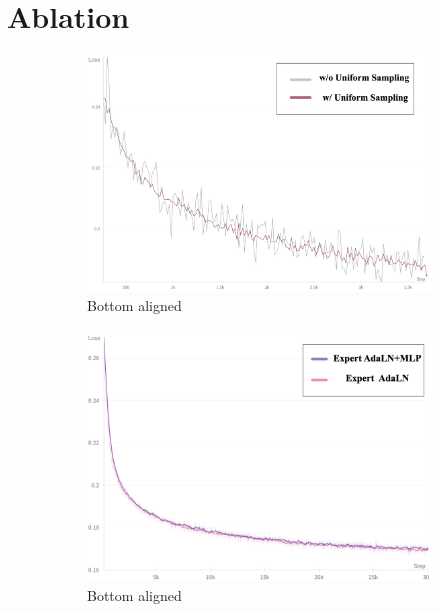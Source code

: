 

\section{Ablation}
\begin{figure}[h]
    \centering
    \begin{subfigure}[b]{0.48\textwidth}
        \includegraphics[width=\textwidth]{images/ab_us.png}
        \caption{Bottom aligned}
        \label{fig:a}
    \end{subfigure}
    \begin{subfigure}[b]{0.48\textwidth}
        \includegraphics[width=\textwidth]{images/ab_ex.png}
        \caption{Bottom aligned}
        \label{fig:b}
    \end{subfigure}
    \begin{subfigure}[b]{0.50\textwidth}

\end{subfigure}
\end{figure}
